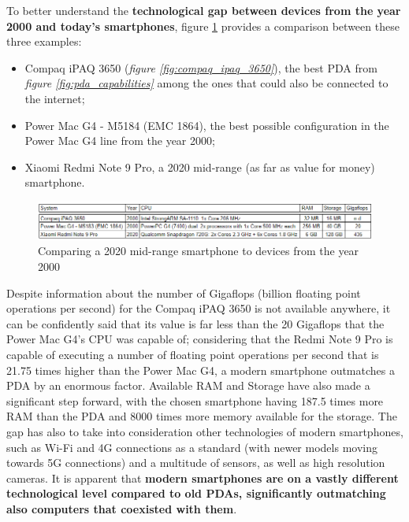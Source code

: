 To better understand the \textbf{technological gap between devices from the year 2000 and today's smartphones}, {figure \ref{fig:three_systems_comparison}} provides a comparison between these three examples:
\begin{itemize}
    \item Compaq iPAQ 3650 (\textit{figure \ref{fig:compaq_ipaq_3650}}), the best PDA from \textit{figure \ref{fig:pda_capabilities}} among the ones that could also be connected to the internet;
    \item Power Mac G4 - M5184 (EMC 1864), the best possible configuration in the Power Mac G4 line from the year 2000;
    \item Xiaomi Redmi Note 9 Pro, a 2020 mid-range (as far as value for money) smartphone.
\end{itemize}
\vspace*{5mm}

\begin{figure}[!ht]
    \centering
    \includegraphics[scale=0.88]{document/chapters/chapter_1/images/three_systems_comparison.png}
    \caption{Comparing a 2020 mid-range smartphone to devices from the year 2000}
    \label{fig:three_systems_comparison}
\end{figure}

Despite information about the number of Gigaflops (billion floating point operations per second) for the Compaq iPAQ 3650 is not available anywhere, it can be confidently said that its value is far less than the 20 Gigaflops that the Power Mac G4's CPU was capable of; considering that the Redmi Note 9 Pro is capable of executing a number of floating point operations per second that is 21.75 times higher than the Power Mac G4, a modern smartphone outmatches a PDA by an enormous factor. Available RAM and Storage have also made a significant step forward, with the chosen smartphone having 187.5 times more RAM than the PDA and 8000 times more memory available for the storage. The gap has also to take into consideration other technologies of modern smartphones, such as Wi-Fi and 4G connections as a standard (with newer models moving towards 5G connections) and a multitude of sensors, as well as high resolution cameras. 
It is apparent that \textbf{modern smartphones are on a vastly different technological level compared to old PDAs, significantly outmatching also computers that coexisted with them}.
